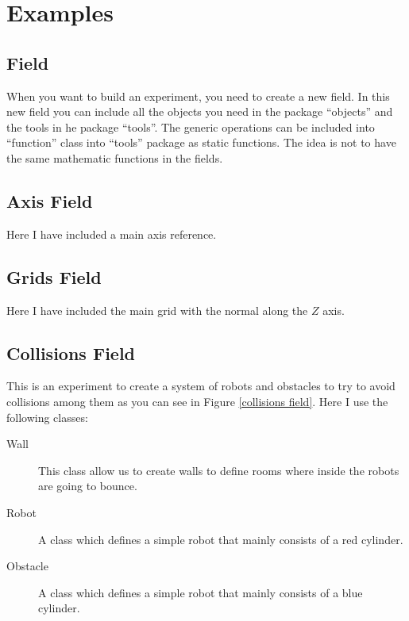 \documentclass[12pt,a4paper,oneside,english]{book}
\begin{document}
\chapter{Examples}

\section{Field}

When you want to build an experiment, you need to create a new field. In this new field you can include all the objects you need in the package ``objects'' and the tools in he package ``tools''. The generic operations can be included into ``function'' class into ``tools'' package as static functions. The idea is not to have the same mathematic functions in the fields.

\section{Axis Field}

Here I have included a main axis reference.

\section{Grids Field}

Here I have included the main grid with the normal along the $Z$ axis.

\section{Collisions Field}

This is an experiment to create a system of robots and obstacles to try to avoid collisions among them as you can see in Figure \ref{collisions field}. Here I use the following classes:

\begin{description}
\item[Wall ] This class allow us to create walls to define rooms where inside the robots are going to bounce.
\item[Robot ] A class which defines a simple robot that mainly consists of a red cylinder.
\item[Obstacle ] A class which defines a simple robot that mainly consists of a blue cylinder.
\end{description}
\end{document}
